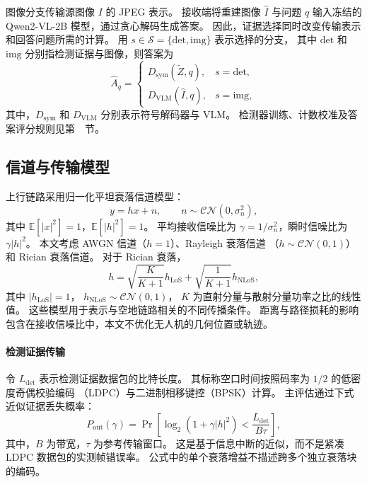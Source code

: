 图像分支传输源图像 $I$ 的 JPEG 表示。
接收端将重建图像 $\hat I$ 与问题 $q$ 输入冻结的
Qwen2-VL-2B 模型\cite{wang2024qwen2vl}，通过贪心解码生成答案。
因此，证据选择同时改变传输表示和回答问题所需的计算。
用 $s\in\mathcal{S}=\{\mathrm{det},\mathrm{img}\}$ 表示选择的分支，
其中 $\mathrm{det}$ 和 $\mathrm{img}$ 分别指检测证据与图像，则答案为
\begin{equation}
\hat A_q=
\begin{cases}
D_{\mathrm{sym}}(\tilde Z,q), & s=\mathrm{det},\\[2pt]
D_{\mathrm{VLM}}(\hat I,q), & s=\mathrm{img},
\end{cases}
\end{equation}
其中，$D_{\mathrm{sym}}$ 和 $D_{\mathrm{VLM}}$ 分别表示符号解码器与 VLM。
检测器训练、计数校准及答案评分规则见第~~节。

\subsection{信道与传输模型}\label{subsec:phy}
上行链路采用归一化平坦衰落信道模型：
\begin{equation}
y=hx+n,\qquad n\sim\mathcal{CN}(0,\sigma_n^2),
\end{equation}
其中 $\mathbb{E}[|x|^2]=1$，$\mathbb{E}[|h|^2]=1$。
平均接收信噪比为 $\gamma=1/\sigma_n^2$，瞬时信噪比为 $\gamma|h|^2$。
本文考虑 AWGN 信道（$h=1$）、Rayleigh 衰落信道
（$h\sim\mathcal{CN}(0,1)$）和 Rician 衰落信道。
对于 Rician 衰落，
\begin{equation}
h=\sqrt{\frac{K}{K+1}}h_{\mathrm{LoS}}
 +\sqrt{\frac{1}{K+1}}h_{\mathrm{NLoS}},
\end{equation}
其中 $|h_{\mathrm{LoS}}|=1$，
$h_{\mathrm{NLoS}}\sim\mathcal{CN}(0,1)$，
$K$ 为直射分量与散射分量功率之比的线性值。
这些模型用于表示与空地链路相关的不同传播条件\cite{khawaja2019survey}。
距离与路径损耗的影响包含在接收信噪比中，本文不优化无人机的几何位置或轨迹。

\paragraph{检测证据传输}
令 $L_{\mathrm{det}}$ 表示检测证据数据包的比特长度。
其标称空口时间按照码率为 $1/2$ 的低密度奇偶校验编码
（LDPC）\cite{gallager1962ldpc}与二进制相移键控（BPSK）计算。
主评估通过下式近似证据丢失概率：
\begin{equation}
P_{\mathrm{out}}(\gamma)
=\Pr\!\left[\log_2(1+\gamma|h|^2)
 <\frac{L_{\mathrm{det}}}{B\tau}\right],
\end{equation}
其中，$B$ 为带宽，$\tau$ 为参考传输窗口。
这是基于信息中断的近似，而不是紧凑 LDPC 数据包的实测帧错误率。
公式中的单个衰落增益不描述跨多个独立衰落块的编码\cite{tse2005fundamentals}。

